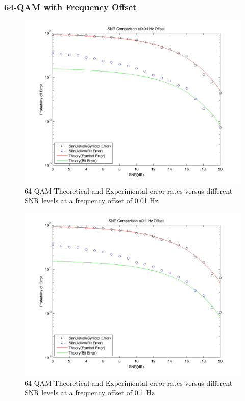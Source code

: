 \documentclass[]{article}
\begin{document}
\subsubsection{64-QAM with Frequency Offset}
\begin{figure}[H]
\centering
\hspace*{-2cm}\includegraphics[width=1.3\textwidth]{qam64SNRfo1.jpg}
\caption{64-QAM Theoretical and Experimental error rates versus different SNR levels at a frequency offset of 0.01 Hz}
\end{figure}

\begin{figure}[H]
\centering
\hspace*{-2cm}\includegraphics[width=1.3\textwidth]{qam64SNRfo2.jpg}
\caption{64-QAM Theoretical and Experimental error rates versus different SNR levels at a frequency offset of 0.1 Hz}
\end{figure}
\end{document}
